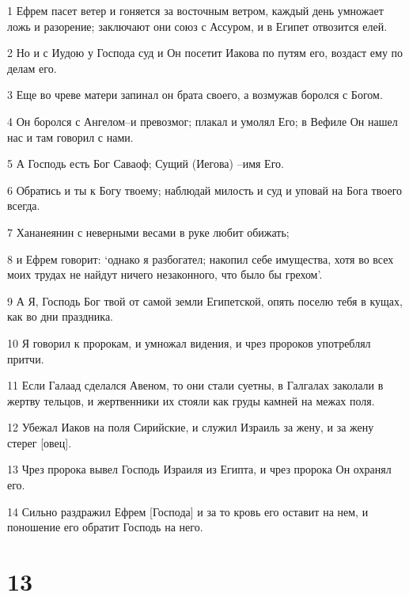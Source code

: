 \par 1 Ефрем пасет ветер и гоняется за восточным ветром, каждый день умножает ложь и разорение; заключают они союз с Ассуром, и в Египет отвозится елей.
\par 2 Но и с Иудою у Господа суд и Он посетит Иакова по путям его, воздаст ему по делам его.
\par 3 Еще во чреве матери запинал он брата своего, а возмужав боролся с Богом.
\par 4 Он боролся с Ангелом--и превозмог; плакал и умолял Его; в Вефиле Он нашел нас и там говорил с нами.
\par 5 А Господь есть Бог Саваоф; Сущий (Иегова) --имя Его.
\par 6 Обратись и ты к Богу твоему; наблюдай милость и суд и уповай на Бога твоего всегда.
\par 7 Хананеянин с неверными весами в руке любит обижать;
\par 8 и Ефрем говорит: `однако я разбогател; накопил себе имущества, хотя во всех моих трудах не найдут ничего незаконного, что было бы грехом'.
\par 9 А Я, Господь Бог твой от самой земли Египетской, опять поселю тебя в кущах, как во дни праздника.
\par 10 Я говорил к пророкам, и умножал видения, и чрез пророков употреблял притчи.
\par 11 Если Галаад сделался Авеном, то они стали суетны, в Галгалах заколали в жертву тельцов, и жертвенники их стояли как груды камней на межах поля.
\par 12 Убежал Иаков на поля Сирийские, и служил Израиль за жену, и за жену стерег [овец].
\par 13 Чрез пророка вывел Господь Израиля из Египта, и чрез пророка Он охранял его.
\par 14 Сильно раздражил Ефрем [Господа] и за то кровь его оставит на нем, и поношение его обратит Господь на него.

\chapter{13}

